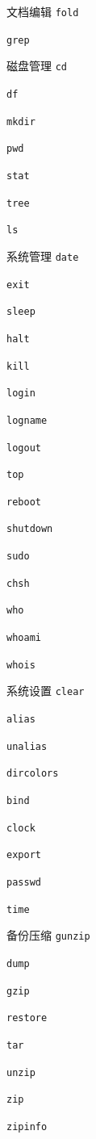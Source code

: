 \documentclass{ctexart}
\begin{document}
\begin{mybox}{文档编辑}
    \texttt{fold}

    \texttt{grep}
\end{mybox}

\begin{mybox}{磁盘管理}
    \texttt{cd}

    \texttt{df}

    \texttt{mkdir}

    \texttt{pwd}

    \texttt{stat}

    \texttt{tree}

    \texttt{ls}
\end{mybox}

\begin{mybox}{系统管理}
    \texttt{date}

    \texttt{exit}

    \texttt{sleep}

    \texttt{halt}
    
    \texttt{kill}

    \texttt{login}

    \texttt{logname}

    \texttt{logout}

    \texttt{top}

    \texttt{reboot}

    \texttt{shutdown}
    
    \texttt{sudo}

    \texttt{chsh}

    \texttt{who}

    \texttt{whoami}

    \texttt{whois}
\end{mybox}

\begin{mybox}{系统设置}
    \texttt{clear}

    \texttt{alias}

    \texttt{unalias}

    \texttt{dircolors}

    \texttt{bind}

    \texttt{clock}

    \texttt{export}

    \texttt{passwd}

    \texttt{time}
\end{mybox}

\begin{mybox}{备份压缩}
    \texttt{gunzip}

    \texttt{dump}
    
    \texttt{gzip}

    \texttt{restore}

    \texttt{tar}
    
    \texttt{unzip}

    \texttt{zip}

    \texttt{zipinfo}
\end{mybox}
\end{document}
